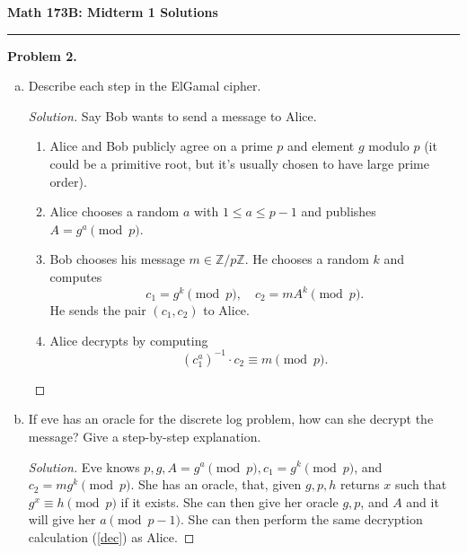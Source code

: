 \documentclass[11pt,letterpaper]{report}
\newcommand{\integers}{\mathbb{Z}}
\newenvironment{solution}
{\begin{proof}[Solution]}
{\end{proof}}
\begin{document}
\begin{center}
{\bf \Large Math 173B: Midterm 1 Solutions}
\vspace{0.2cm}
\hrule
\end{center}

\noindent\textbf{Problem 2. }
\begin{enumerate}[(a)]
	\item Describe each step in the ElGamal cipher.
	\begin{solution}
		Say Bob wants to send a message to Alice.
		\begin{enumerate}[1.]
			\item Alice and Bob publicly agree on a prime $p$ and element $g$ modulo $p$ (it could be a primitive root, but it's usually chosen to have large prime order).
			\item Alice chooses a random $a$ with $1\leq a\leq p-1$ and publishes $A = g^a\pmod{p}$.
			\item Bob chooses his message $m\in \integers/p\integers$. He chooses a random $k$ and computes
			\[
			c_1 = g^k\pmod{p},\quad c_2 = mA^k\pmod{p}.
			\]
			He sends the pair $(c_1, c_2)$ to Alice.
			\item Alice decrypts by computing
			\begin{equation}\label{dec}
			(c_1^a)^{-1}\cdot c_2 \equiv m\pmod{p}.
			\end{equation}
		\end{enumerate}
	\end{solution}

	\item If eve has an oracle for the discrete log problem, how can she decrypt the message? Give a step-by-step explanation.
	\begin{solution}
		Eve knows $p, g, A = g^a\pmod{p}, c_1 = g^k\pmod{p}$, and $c_2 = mg^k\pmod{p}$. She has an oracle, that, given $g, p, h$ returns $x$ such that $g^x\equiv h\pmod{p}$ if it exists. She can then give her oracle $g, p$, and $A$ and it will give her $a\pmod{p-1}$. She can then perform the same decryption calculation (\ref{dec}) as Alice.
	\end{solution}
\end{enumerate}
\end{document}
